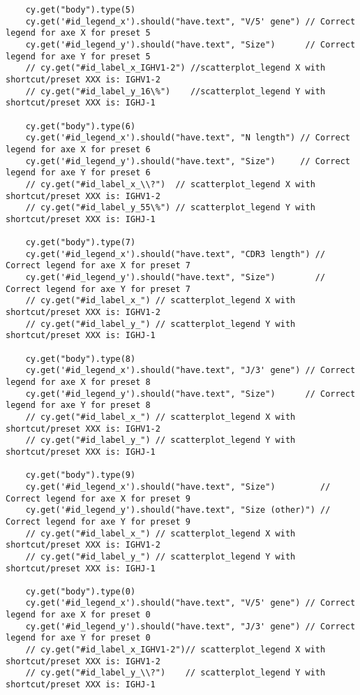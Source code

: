 \begin{verbatim}
    cy.get("body").type(5)
    cy.get('#id_legend_x').should("have.text", "V/5' gene") // Correct legend for axe X for preset 5
    cy.get('#id_legend_y').should("have.text", "Size")      // Correct legend for axe Y for preset 5
    // cy.get("#id_label_x_IGHV1-2") //scatterplot_legend X with shortcut/preset XXX is: IGHV1-2
    // cy.get("#id_label_y_16\%")    //scatterplot_legend Y with shortcut/preset XXX is: IGHJ-1

    cy.get("body").type(6)
    cy.get('#id_legend_x').should("have.text", "N length") // Correct legend for axe X for preset 6
    cy.get('#id_legend_y').should("have.text", "Size")     // Correct legend for axe Y for preset 6
    // cy.get("#id_label_x_\\?")  // scatterplot_legend X with shortcut/preset XXX is: IGHV1-2
    // cy.get("#id_label_y_55\%") // scatterplot_legend Y with shortcut/preset XXX is: IGHJ-1

    cy.get("body").type(7)
    cy.get('#id_legend_x').should("have.text", "CDR3 length") // Correct legend for axe X for preset 7
    cy.get('#id_legend_y').should("have.text", "Size")        // Correct legend for axe Y for preset 7
    // cy.get("#id_label_x_") // scatterplot_legend X with shortcut/preset XXX is: IGHV1-2
    // cy.get("#id_label_y_") // scatterplot_legend Y with shortcut/preset XXX is: IGHJ-1

    cy.get("body").type(8)
    cy.get('#id_legend_x').should("have.text", "J/3' gene") // Correct legend for axe X for preset 8
    cy.get('#id_legend_y').should("have.text", "Size")      // Correct legend for axe Y for preset 8
    // cy.get("#id_label_x_") // scatterplot_legend X with shortcut/preset XXX is: IGHV1-2
    // cy.get("#id_label_y_") // scatterplot_legend Y with shortcut/preset XXX is: IGHJ-1

    cy.get("body").type(9)
    cy.get('#id_legend_x').should("have.text", "Size")         // Correct legend for axe X for preset 9
    cy.get('#id_legend_y').should("have.text", "Size (other)") // Correct legend for axe Y for preset 9
    // cy.get("#id_label_x_") // scatterplot_legend X with shortcut/preset XXX is: IGHV1-2
    // cy.get("#id_label_y_") // scatterplot_legend Y with shortcut/preset XXX is: IGHJ-1

    cy.get("body").type(0)
    cy.get('#id_legend_x').should("have.text", "V/5' gene") // Correct legend for axe X for preset 0
    cy.get('#id_legend_y').should("have.text", "J/3' gene") // Correct legend for axe Y for preset 0
    // cy.get("#id_label_x_IGHV1-2")// scatterplot_legend X with shortcut/preset XXX is: IGHV1-2
    // cy.get("#id_label_y_\\?")    // scatterplot_legend Y with shortcut/preset XXX is: IGHJ-1

\end{verbatim}

